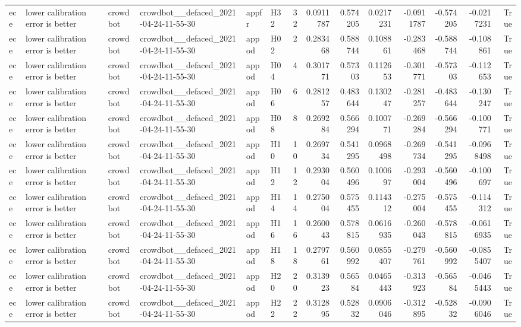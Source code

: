 \begin{longtable}{llllllrrrrrrrr}
ece & lower calibration error is better & crowdbot & crowdbot\_\_defaced\_2021-04-24-11-55-30 & appfr & H32 & 32 & 0.0911787 & 0.574205 & 0.0217231 & -0.0911787 & -0.574205 & -0.0217231 & True \\
ece & lower calibration error is better & crowdbot & crowdbot\_\_defaced\_2021-04-24-11-55-30 & appod & H02 & 2 & 0.283468 & 0.588744 & 0.108861 & -0.283468 & -0.588744 & -0.108861 & True \\
ece & lower calibration error is better & crowdbot & crowdbot\_\_defaced\_2021-04-24-11-55-30 & appod & H04 & 4 & 0.301771 & 0.57303 & 0.112653 & -0.301771 & -0.57303 & -0.112653 & True \\
ece & lower calibration error is better & crowdbot & crowdbot\_\_defaced\_2021-04-24-11-55-30 & appod & H06 & 6 & 0.281257 & 0.483644 & 0.130247 & -0.281257 & -0.483644 & -0.130247 & True \\
ece & lower calibration error is better & crowdbot & crowdbot\_\_defaced\_2021-04-24-11-55-30 & appod & H08 & 8 & 0.269284 & 0.566294 & 0.100771 & -0.269284 & -0.566294 & -0.100771 & True \\
ece & lower calibration error is better & crowdbot & crowdbot\_\_defaced\_2021-04-24-11-55-30 & appod & H10 & 10 & 0.269734 & 0.541295 & 0.0968498 & -0.269734 & -0.541295 & -0.0968498 & True \\
ece & lower calibration error is better & crowdbot & crowdbot\_\_defaced\_2021-04-24-11-55-30 & appod & H12 & 12 & 0.293004 & 0.560496 & 0.100697 & -0.293004 & -0.560496 & -0.100697 & True \\
ece & lower calibration error is better & crowdbot & crowdbot\_\_defaced\_2021-04-24-11-55-30 & appod & H14 & 14 & 0.275004 & 0.575455 & 0.114312 & -0.275004 & -0.575455 & -0.114312 & True \\
ece & lower calibration error is better & crowdbot & crowdbot\_\_defaced\_2021-04-24-11-55-30 & appod & H16 & 16 & 0.260043 & 0.578815 & 0.0616935 & -0.260043 & -0.578815 & -0.0616935 & True \\
ece & lower calibration error is better & crowdbot & crowdbot\_\_defaced\_2021-04-24-11-55-30 & appod & H18 & 18 & 0.279761 & 0.560992 & 0.0855407 & -0.279761 & -0.560992 & -0.0855407 & True \\
ece & lower calibration error is better & crowdbot & crowdbot\_\_defaced\_2021-04-24-11-55-30 & appod & H20 & 20 & 0.313923 & 0.56584 & 0.0465443 & -0.313923 & -0.56584 & -0.0465443 & True \\
ece & lower calibration error is better & crowdbot & crowdbot\_\_defaced\_2021-04-24-11-55-30 & appod & H22 & 22 & 0.312895 & 0.52832 & 0.0906046 & -0.312895 & -0.52832 & -0.0906046 & True \\

\end{longtable}
